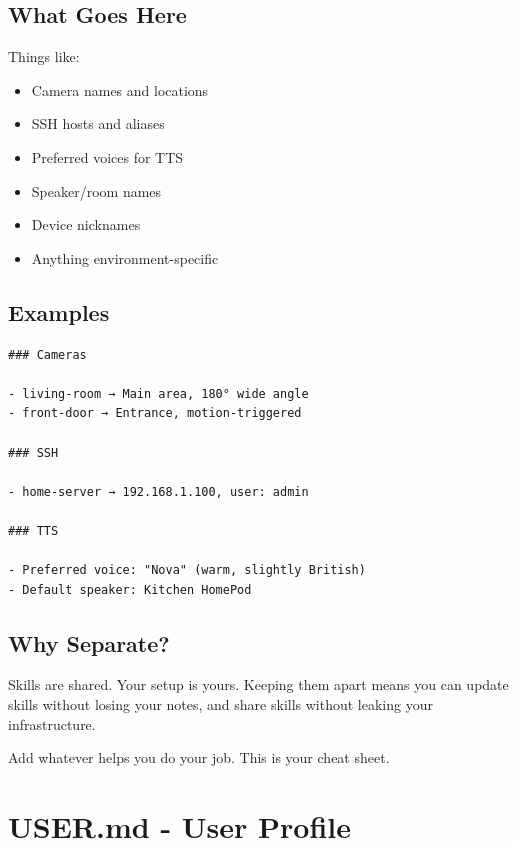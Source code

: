 \subsection{What Goes Here}


Things like:

\begin{itemize}
  \item Camera names and locations
  \item SSH hosts and aliases
  \item Preferred voices for TTS
  \item Speaker/room names
  \item Device nicknames
  \item Anything environment-specific
\end{itemize}


\subsection{Examples}


\begin{lstlisting}
### Cameras

- living-room → Main area, 180° wide angle
- front-door → Entrance, motion-triggered

### SSH

- home-server → 192.168.1.100, user: admin

### TTS

- Preferred voice: "Nova" (warm, slightly British)
- Default speaker: Kitchen HomePod
\end{lstlisting}


\subsection{Why Separate?}


Skills are shared. Your setup is yours. Keeping them apart means you can update skills without losing your notes, and share skills without leaking your infrastructure.

\hrulefill


Add whatever helps you do your job. This is your cheat sheet.


\clearpage

\section{USER.md - User Profile}


